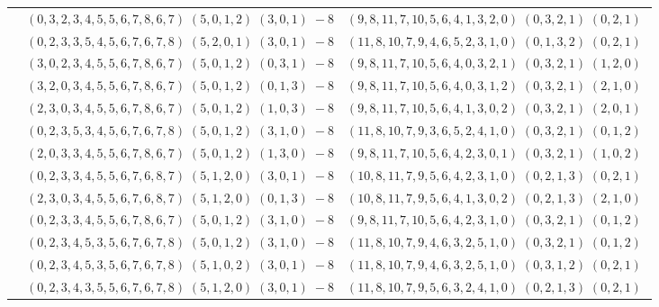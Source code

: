 \documentclass[11pt]{article}
\begin{document}
\begin{longtable}[l]{|c|c|c|}
 \cline{2-3} 
 & $(0 ,3 ,2 ,3 ,4 ,5 ,5 ,6 ,7 ,8 ,6 ,7) \;(5 ,0 ,1 ,2) \;(3 ,0 ,1) \;-8$ & $(9 ,8 ,11 ,7 ,10 ,5 ,6 ,4 ,1 ,3 ,2 ,0) \;(0 ,3 ,2 ,1) \;(0 ,2 ,1) \;$\\ 
 \cline{2-3} 
 & $(0 ,2 ,3 ,3 ,5 ,4 ,5 ,6 ,7 ,6 ,7 ,8) \;(5 ,2 ,0 ,1) \;(3 ,0 ,1) \;-8$ & $(11 ,8 ,10 ,7 ,9 ,4 ,6 ,5 ,2 ,3 ,1 ,0) \;(0 ,1 ,3 ,2) \;(0 ,2 ,1) \;$\\ 
 \cline{2-3} 
 & $(3 ,0 ,2 ,3 ,4 ,5 ,5 ,6 ,7 ,8 ,6 ,7) \;(5 ,0 ,1 ,2) \;(0 ,3 ,1) \;-8$ & $(9 ,8 ,11 ,7 ,10 ,5 ,6 ,4 ,0 ,3 ,2 ,1) \;(0 ,3 ,2 ,1) \;(1 ,2 ,0) \;$\\ 
 \cline{2-3} 
 & $(3 ,2 ,0 ,3 ,4 ,5 ,5 ,6 ,7 ,8 ,6 ,7) \;(5 ,0 ,1 ,2) \;(0 ,1 ,3) \;-8$ & $(9 ,8 ,11 ,7 ,10 ,5 ,6 ,4 ,0 ,3 ,1 ,2) \;(0 ,3 ,2 ,1) \;(2 ,1 ,0) \;$\\ 
 \cline{2-3} 
 & $(2 ,3 ,0 ,3 ,4 ,5 ,5 ,6 ,7 ,8 ,6 ,7) \;(5 ,0 ,1 ,2) \;(1 ,0 ,3) \;-8$ & $(9 ,8 ,11 ,7 ,10 ,5 ,6 ,4 ,1 ,3 ,0 ,2) \;(0 ,3 ,2 ,1) \;(2 ,0 ,1) \;$\\ 
 \cline{2-3} 
 & $(0 ,2 ,3 ,5 ,3 ,4 ,5 ,6 ,7 ,6 ,7 ,8) \;(5 ,0 ,1 ,2) \;(3 ,1 ,0) \;-8$ & $(11 ,8 ,10 ,7 ,9 ,3 ,6 ,5 ,2 ,4 ,1 ,0) \;(0 ,3 ,2 ,1) \;(0 ,1 ,2) \;$\\ 
 \cline{2-3} 
 & $(2 ,0 ,3 ,3 ,4 ,5 ,5 ,6 ,7 ,8 ,6 ,7) \;(5 ,0 ,1 ,2) \;(1 ,3 ,0) \;-8$ & $(9 ,8 ,11 ,7 ,10 ,5 ,6 ,4 ,2 ,3 ,0 ,1) \;(0 ,3 ,2 ,1) \;(1 ,0 ,2) \;$\\ 
 \cline{2-3} 
 & $(0 ,2 ,3 ,3 ,4 ,5 ,5 ,6 ,7 ,6 ,8 ,7) \;(5 ,1 ,2 ,0) \;(3 ,0 ,1) \;-8$ & $(10 ,8 ,11 ,7 ,9 ,5 ,6 ,4 ,2 ,3 ,1 ,0) \;(0 ,2 ,1 ,3) \;(0 ,2 ,1) \;$\\ 
 \cline{2-3} 
 & $(2 ,3 ,0 ,3 ,4 ,5 ,5 ,6 ,7 ,6 ,8 ,7) \;(5 ,1 ,2 ,0) \;(0 ,1 ,3) \;-8$ & $(10 ,8 ,11 ,7 ,9 ,5 ,6 ,4 ,1 ,3 ,0 ,2) \;(0 ,2 ,1 ,3) \;(2 ,1 ,0) \;$\\ 
 \cline{2-3} 
 & $(0 ,2 ,3 ,3 ,4 ,5 ,5 ,6 ,7 ,8 ,6 ,7) \;(5 ,0 ,1 ,2) \;(3 ,1 ,0) \;-8$ & $(9 ,8 ,11 ,7 ,10 ,5 ,6 ,4 ,2 ,3 ,1 ,0) \;(0 ,3 ,2 ,1) \;(0 ,1 ,2) \;$\\ 
 \cline{2-3} 
 & $(0 ,2 ,3 ,4 ,5 ,3 ,5 ,6 ,7 ,6 ,7 ,8) \;(5 ,0 ,1 ,2) \;(3 ,1 ,0) \;-8$ & $(11 ,8 ,10 ,7 ,9 ,4 ,6 ,3 ,2 ,5 ,1 ,0) \;(0 ,3 ,2 ,1) \;(0 ,1 ,2) \;$\\ 
 \cline{2-3} 
 & $(0 ,2 ,3 ,4 ,5 ,3 ,5 ,6 ,7 ,6 ,7 ,8) \;(5 ,1 ,0 ,2) \;(3 ,0 ,1) \;-8$ & $(11 ,8 ,10 ,7 ,9 ,4 ,6 ,3 ,2 ,5 ,1 ,0) \;(0 ,3 ,1 ,2) \;(0 ,2 ,1) \;$\\ 
 \cline{2-3} 
 & $(0 ,2 ,3 ,4 ,3 ,5 ,5 ,6 ,7 ,6 ,7 ,8) \;(5 ,1 ,2 ,0) \;(3 ,0 ,1) \;-8$ & $(11 ,8 ,10 ,7 ,9 ,5 ,6 ,3 ,2 ,4 ,1 ,0) \;(0 ,2 ,1 ,3) \;(0 ,2 ,1) \;$\\ 

\end{longtable}
\end{document}

